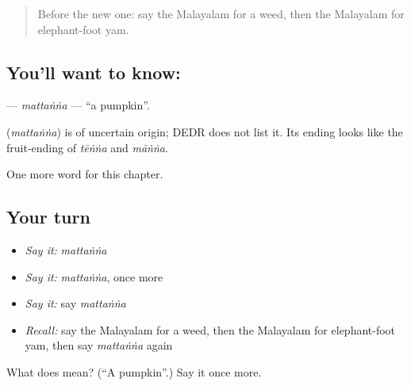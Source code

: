 \label{lesson:ML-C218-mattanna}



\begin{quote}
Before the new one: say the Malayalam for a weed, then the Malayalam for elephant-foot yam.
\end{quote}

\subsection*{You'll want to know: }
\textbf{} — \emph{mattaṅṅa} — \textquotedblleft{}a pumpkin\textquotedblright{}.

\begin{cousinweb}
\textbf{} (\emph{mattaṅṅa}) is of uncertain origin; DEDR does not list it. Its ending looks like the fruit-ending of \emph{tēṅṅa} and \emph{māṅṅa}.
\end{cousinweb}

\begin{grammarlens}[title={What you've built}]
One more word for this chapter.
\end{grammarlens}

\subsection*{Your turn}
\begin{itemize}
\raggedright
  \item \emph{Say it:} \emph{mattaṅṅa}
  \item \emph{Say it:} \emph{mattaṅṅa}, once more
  \item \emph{Say it:} say \emph{mattaṅṅa}
  \item \emph{Recall:} say the Malayalam for a weed, then the Malayalam for elephant-foot yam, then say \emph{mattaṅṅa} again
\end{itemize}

\begin{tcolorbox}[breakable,colback=teal!4,colframe=teal!35!black,title={Before you move on}]
What does  mean? (\textquotedblleft{}A pumpkin\textquotedblright{}.) Say it once more.
\end{tcolorbox}
